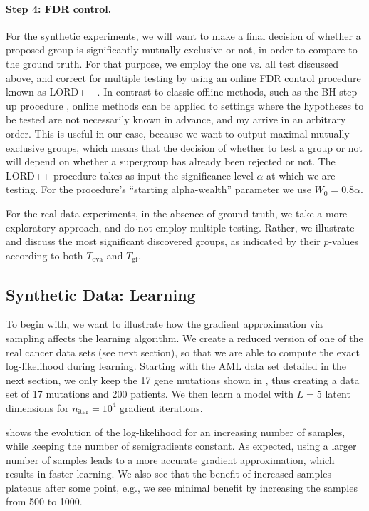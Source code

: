 \paragraph{Step 4: FDR control.}
For the synthetic experiments, we will want to make a final decision of whether a proposed group is significantly mutually exclusive or not, in order to compare to the ground truth.
For that purpose, we employ the one vs. all test discussed above, and correct for multiple testing by using an online FDR control procedure known as LORD++ \citep{lordpp,lord}.
In contrast to classic offline methods, such as the BH step-up procedure \citep{bh}, online methods can be applied to settings where the hypotheses to be tested are not necessarily known in advance, and my arrive in an arbitrary order.
This is useful in our case, because we want to output maximal mutually exclusive groups, which means that the decision of whether to test a group or not will depend on whether a supergroup has already been rejected or not.
The LORD++ procedure takes as input the significance level $\alpha$ at which we are testing.
For the procedure's ``starting alpha-wealth'' parameter we use $W_0 = 0.8\alpha$.

For the real data experiments, in the absence of ground truth, we take a more exploratory approach, and do not employ multiple testing.
Rather, we illustrate and discuss the most significant discovered groups, as indicated by their $p$-values according to both $T_{\mathrm{ova}}$ and $T_{\mathrm{gf}}$.

\subsection{Synthetic Data: Learning}
To begin with, we want to illustrate how the gradient approximation via sampling affects the learning algorithm.
We create a reduced version of one of the real cancer data sets (see next section), so that we are able to compute the exact log-likelihood during learning.
Starting with the AML data set detailed in the next section, we only keep the 17 gene mutations shown in , thus creating a data set of 17 mutations and 200 patients.
We then learn a \fldc{} model with $L = 5$ latent dimensions for $n_{\mathrm{iter}} = 10^4$ gradient iterations.

 shows the evolution of the log-likelihood for an increasing number of samples, while keeping the number of semigradients constant.
As expected, using a larger number of samples leads to a more accurate gradient approximation, which results in faster learning.
We also see that the benefit of increased samples plateaus after some point, e.g., we see minimal benefit by increasing the samples from 500 to 1000.

